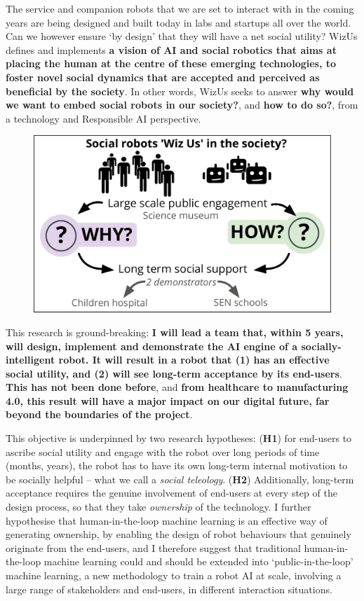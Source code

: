 \documentclass[11pt,a4paper]{report}
\newcommand{\project}{WizUs\xspace}
\begin{document}
The service and companion robots that we are set to interact with in the coming
years are being designed and built today in labs and startups all over the
world. Can we however ensure `by design' that they will have a net social
utility?  \project defines and implements \textbf{a vision of AI and social
robotics that aims at placing the human at the centre of these emerging
technologies, to foster novel social dynamics that are accepted and perceived as
beneficial by the society}. In other words, \project seeks to answer \textbf{why
would we want to embed social robots in our society?}, and \textbf{how to do
so?}, from a technology and Responsible AI perspective.

\begin{figure}
    \centering
    \vspace{-7pt}
    \includegraphics[width=\linewidth]{concept}
    \label{fig|concept}
\end{figure}


This research is ground-breaking: \textbf{I will lead a team that, within 5
years, will design, implement and demonstrate the AI engine of a
socially-intelligent robot. It will result in a robot that (1) has an
effective social utility, and (2) will see long-term acceptance by its
end-users}. \textbf{This has not been done before}, and \textbf{from healthcare to manufacturing
4.0, this result will have a major impact on our digital future, far beyond the
boundaries of the project}.

This objective is underpinned by two research hypotheses: (\textbf{H1}) for
end-users to ascribe social utility and engage with the robot over long periods
of time (months, years), the robot has to have its own long-term internal
motivation to be socially helpful -- what we call a \emph{social teleology}. (\textbf{H2})
Additionally, long-term acceptance requires the genuine involvement of end-users
at every step of the design process, so that they take \emph{ownership} of the
technology. I further hypothesise that human-in-the-loop machine learning is an
effective way of generating ownership, by enabling the design of robot
behaviours that genuinely originate from the end-users, and I therefore suggest
that traditional human-in-the-loop machine learning could and should be extended
into `public-in-the-loop' machine learning, a new methodology to train a robot
AI at scale, involving a large range of stakeholders and end-users, in different
interaction situations.
\end{document}

